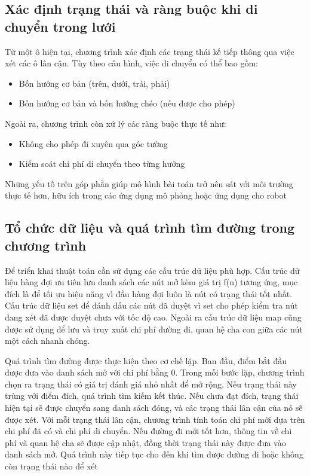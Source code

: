 \documentclass[12pt,a4paper]{report}
\begin{document}
\subsection{Xác định trạng thái và ràng buộc khi di chuyển trong lưới}
Từ một ô hiện tại, chương trình xác định các trạng thái kế tiếp thông qua việc xét các ô lân cận. Tùy theo cấu hình, việc di chuyển có thể bao gồm: 
\begin{itemize}
    \item Bốn hướng cơ bản (trên, dưới, trái, phải)
    \item Bốn hướng cơ bản và bốn hướng chéo (nếu được cho phép) 
\end{itemize}
Ngoài ra, chương trình còn xử lý các ràng buộc thực tế như: 
\begin{itemize}
    \item Không cho phép đi xuyên qua góc tường 
    \item Kiểm soát chi phí di chuyển theo từng hướng  
\end{itemize}
Những yếu tố trên góp phần giúp mô hình bài toán trở nên sát với môi trường  thực tế hơn, hữu ích trong các ứng dụng mô phỏng hoặc ứng dụng cho robot
\subsection{Tổ chức dữ liệu và quá trình tìm đường trong chương trình }
Để triển khai thuật toán cần sử dụng các cấu trúc dữ liệu phù hợp. Cấu trúc dữ liệu hàng đợi ưu tiên lưu danh sách các nút mở kèm giá trị f(n) tương ứng, mục đích là để tối ưu hiệu năng vì đầu hàng đợi luôn là nút có trạng thái tốt nhất. Cấu trúc dữ liệu set để đánh dấu các nút đã duyệt vì set cho phép kiểm tra nút đang xét đã được duyệt chưa với tốc độ cao. Ngoài ra cấu trúc dữ liệu map cũng được sử dụng để lưu và truy xuất chi phí đường đi, quan hệ cha con giữa các nút một cách nhanh chóng. 

\setlength{\parindent}{0pt}  
\setlength{\parskip}{6pt} 
Quá trình tìm đường được thực hiện theo cơ chế lặp. Ban đầu, điểm bắt đầu được đưa vào danh sách mở với chi phí bằng 0. Trong mỗi bước lặp, chương trình chọn ra trạng thái có giá trị đánh giá nhỏ nhất để mở rộng. Nếu trạng thái này trùng với điểm đích, quá trình tìm kiếm kết thúc. Nếu chưa đạt đích, trạng thái hiện tại sẽ được chuyển sang danh sách đóng, và các trạng thái lân cận của nó sẽ được xét. Với mỗi trạng thái lân cận, chương trình tính toán chi phí mới dựa trên chi phí đã có và chi phí di chuyển. Nếu đường đi mới tốt hơn, thông tin về chi phí và quan hệ cha sẽ được cập nhật, đồng thời trạng thái này được đưa vào danh sách mở. Quá trình này tiếp tục cho đến khi tìm được đường đi hoặc không còn trạng thái nào để xét
\end{document}
